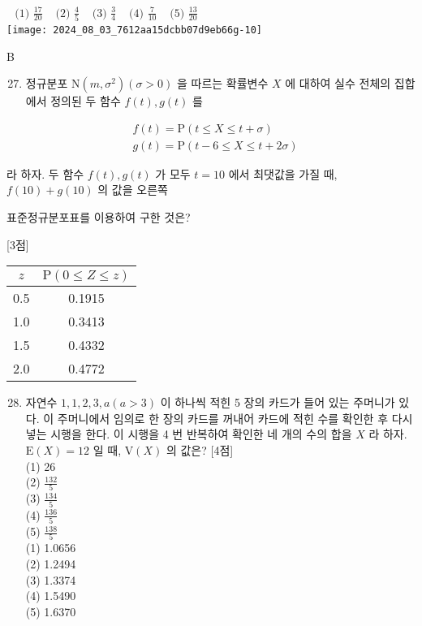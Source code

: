 \documentclass[10pt]{article}
\begin{document}
\(\begin{array}{lllll}\text { (1) } \frac{17}{20} & \text { (2) } \frac{4}{5} & \text { (3) } \frac{3}{4} & \text { (4) } \frac{7}{10} & \text { (5) } \frac{13}{20}\end{array}\)\\
\texttt{[image: 2024\_08\_03\_7612aa15dcbb07d9eb66g-10]}

B

\begin{enumerate}
  \setcounter{enumi}{26}
  \item 정규분포 \(\mathrm{N}\left(m, \sigma^{2}\right)(\sigma>0)\) 을 따르는 확률변수 \(X\) 에 대하여 실수 전체의 집합에서 정의된 두 함수 \(f(t), g(t)\) 를
\end{enumerate}

\[
\begin{aligned}
& f(t)=\mathrm{P}(t \leq X \leq t+\sigma) \\
& g(t)=\mathrm{P}(t-6 \leq X \leq t+2 \sigma)
\end{aligned}
\]

라 하자. 두 함수 \(f(t), g(t)\) 가 모두 \(t=10\) 에서 최댓값을 가질 때, \(f(10)+g(10)\) 의 값을 오른쪽

표준정규분포표를 이용하여 구한 것은?

[3점]

\begin{center}
\begin{tabular}{|c|c|}
\hline
\(z\) & \(\mathrm{P}(0 \leq Z \leq z)\) \\
\hline
0.5 & 0.1915 \\
\hline
1.0 & 0.3413 \\
\hline
1.5 & 0.4332 \\
\hline
2.0 & 0.4772 \\
\hline
\end{tabular}
\end{center}

\begin{enumerate}
  \setcounter{enumi}{27}
  \item 자연수 \(1,1,2,3, a(a>3)\) 이 하나씩 적힌 5 장의 카드가 들어 있는 주머니가 있다. 이 주머니에서 임의로 한 장의 카드를 꺼내어 카드에 적힌 수를 확인한 후 다시 넣는 시행을 한다. 이 시행을 4 번 반복하여 확인한 네 개의 수의 합을 \(X\) 라 하자. \(\mathrm{E}(X)=12\) 일 때, \(\mathrm{V}(X)\) 의 값은? [4점]\\
(1) 26\\
(2) \(\frac{132}{5}\)\\
(3) \(\frac{134}{5}\)\\
(4) \(\frac{136}{5}\)\\
(5) \(\frac{138}{5}\)\\
(1) 1.0656\\
(2) 1.2494\\
(3) 1.3374\\
(4) 1.5490\\
(5) 1.6370
\end{enumerate}
\end{document}
